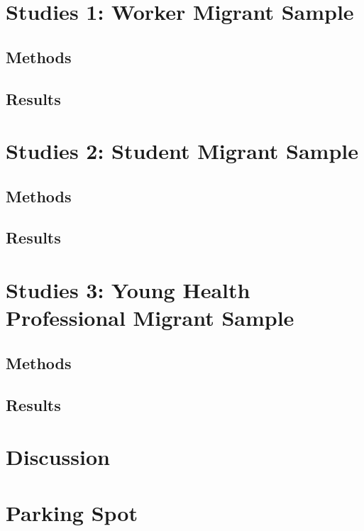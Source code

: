 \documentclass[nobib]{tufte-handout}
\theoremstyle{break}
\theoremstyle{plain}
\begin{document}
\newpage
\section{Studies 1: Worker Migrant Sample}
\subsection{Methods}
\subsection{Results}

\section{Studies 2: Student Migrant Sample}
\subsection{Methods}
\subsection{Results}

\section{Studies 3: Young Health Professional Migrant Sample}
\subsection{Methods}
\subsection{Results}

\section{Discussion}

\newpage
\section{Parking Spot}
\end{document}
